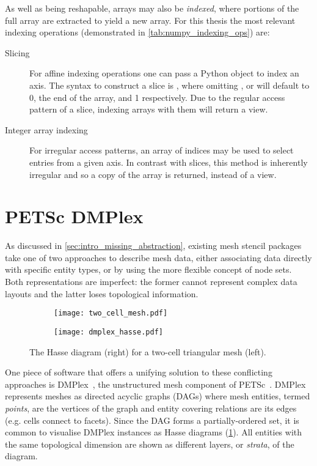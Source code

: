 \documentclass[thesis]{subfiles}
\begin{document}
As well as being reshapable, arrays may also be \emph{indexed}, where portions of the full array are extracted to yield a new array.
For this thesis the most relevant indexing operations (demonstrated in \cref{tab:numpy_indexing_ops}) are:
\begin{description}
  \item[Slicing]
    For affine indexing operations one can pass a Python  object to index an axis.
    The syntax to construct a slice is , where omitting ,  or  will default to 0, the end of the array, and 1 respectively.
    Due to the regular access pattern of a slice, indexing \numpy{} arrays with them will return a view.
  \item[Integer array indexing]
    For irregular access patterns, an array of indices may be used to select entries from a given axis.
    In contrast with slices, this method is inherently irregular and so a copy of the array is returned, instead of a view.
\end{description}

\section{PETSc DMPlex}
\label{sec:foundations_dmplex}


As discussed in \cref{sec:intro_missing_abstraction}, existing mesh stencil packages take one of two approaches to describe mesh data, either associating data directly with specific entity types, or by using the more flexible concept of node sets.
Both representations are imperfect: the former cannot represent complex data layouts and the latter loses topological information.

\begin{figure}
  \centering
  \begin{subfigure}{.49\textwidth}
    \centering
    \texttt{[image: two\_cell\_mesh.pdf]}
  \end{subfigure}
  \begin{subfigure}{.49\textwidth}
    \centering
    \texttt{[image: dmplex\_hasse.pdf]}
  \end{subfigure}
  \caption{
    The Hasse diagram (right) for a two-cell triangular mesh (left).
  }
  \label{fig:dmplex_hasse}
\end{figure}

One piece of software that offers a unifying solution to these conflicting approaches is DMPlex~\cite{knepleyMeshAlgorithmsPDE2009,knepleyUnstructuredOverlappingMesh2015,langeEfficientMeshManagement2016}, the unstructured mesh component of PETSc~\cite{petsc-efficient,petsc-user-ref,petsc-web-page}.
DMPlex represents meshes as directed acyclic graphs (DAGs) where mesh entities, termed \emph{points}, are the vertices of the graph and entity covering relations are its edges (e.g. cells connect to facets).
Since the DAG forms a partially-ordered set, it is common to visualise DMPlex instances as Hasse diagrams (\cref{fig:dmplex_hasse}).
All entities with the same topological dimension are shown as different layers, or \emph{strata}, of the diagram.
\end{document}
